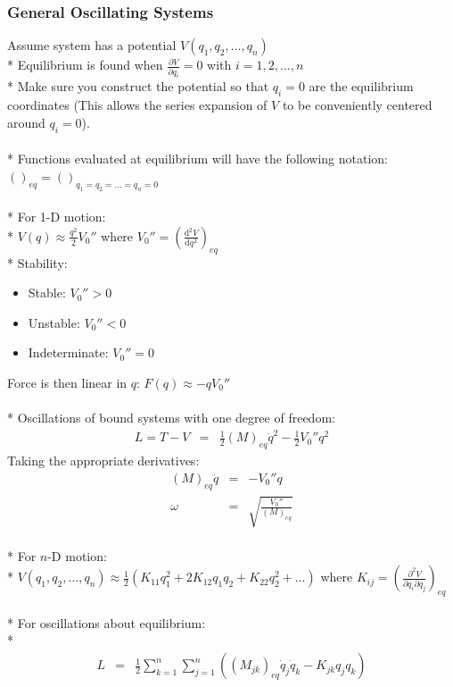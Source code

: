 \subsubsection{General Oscillating Systems}
Assume system has a potential \(V(q_1,q_2,\ldots,q_n)\)\\*
Equilibrium is found when \(\displaystyle\frac{\partial V}{\partial q_i}=0\) with \(i=1,2,\ldots,n\)\\*
Make sure you construct the potential so that \(q_i=0\) are the equilibrium coordinates (This allows the series expansion of \(V\) to be conveniently centered around \(q_i=0\)).\\\\*
Functions evaluated at equilibrium will have the following notation: \(\left(\right)_{eq}=\left(\right)_{q_1=q_2=\ldots=q_n=0}\)\\\\*
For 1-D motion:\\*
\(V(q)\approx\frac{q^2}{2}V_0''\) where \(\displaystyle V_0''=\left(\frac{\mathrm{d}^2V}{\mathrm{d}q^2}\right)_{eq}\)\\*
Stability:
\begin{itemize}
\item Stable: \(V_0'' > 0\)
\item Unstable: \(V_0'' < 0\)
\item Indeterminate: \(V_0'' = 0\)
\end{itemize}
Force is then linear in \(q\): \(F(q)\approx-qV_0''\)\\\\*
Oscillations of bound systems with one degree of freedom:
\begin{eqnarray}
L=T-V&=&\frac{1}{2}(M)_{eq}\dot{q}^2-\frac{1}{2}V_0''q^2 \nonumber
\end{eqnarray}
Taking the appropriate derivatives:
\begin{eqnarray}
(M)_{eq}\ddot{q}&=&-V_0''q  \nonumber\\
\omega&=&\sqrt{\frac{V_0''}{(M)_{eq}}}  \nonumber
\end{eqnarray}
\\*
For \(n\)-D motion:\\*
\(V(q_1,q_2,\ldots,q_n)\approx\frac{1}{2}(K_{11}q_1^2+2K_{12}q_1q_2+K_{22}q_2^2+\ldots)\) where \(\displaystyle K_{ij}=\left(\frac{\partial^2 V}{\partial q_i\partial q_j}\right)_{eq}\)\\\\*
For oscillations about equilibrium:\\*
\begin{eqnarray}
\displaystyle L&=&\frac{1}{2}\sum_{k=1}^{n}\sum_{j=1}^{n}\left(\left(M_{jk}\right)_{eq}\dot{q}_j\dot{q}_k-K_{jk}q_jq_k\right) \nonumber
\end{eqnarray}
